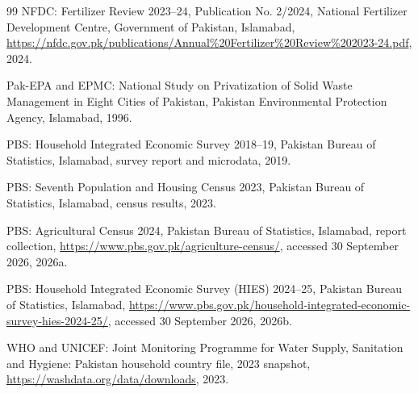 \documentclass[essd]{copernicus}
\begin{document}
\begin{thebibliography}{99}
NFDC: Fertilizer Review 2023--24, Publication No. 2/2024, National Fertilizer Development Centre, Government of Pakistan, Islamabad, \url{https://nfdc.gov.pk/publications/Annual%20Fertilizer%20Review%202023-24.pdf}, 2024.

Pak-EPA and EPMC: National Study on Privatization of Solid Waste Management in Eight Cities of Pakistan, Pakistan Environmental Protection Agency, Islamabad, 1996.

PBS: Household Integrated Economic Survey 2018--19, Pakistan Bureau of Statistics, Islamabad, survey report and microdata, 2019.

PBS: Seventh Population and Housing Census 2023, Pakistan Bureau of Statistics, Islamabad, census results, 2023.

PBS: Agricultural Census 2024, Pakistan Bureau of Statistics, Islamabad, report collection, \url{https://www.pbs.gov.pk/agriculture-census/}, accessed 30 September 2026, 2026a.

PBS: Household Integrated Economic Survey (HIES) 2024--25, Pakistan Bureau of Statistics, Islamabad, \url{https://www.pbs.gov.pk/household-integrated-economic-survey-hies-2024-25/}, accessed 30 September 2026, 2026b.

WHO and UNICEF: Joint Monitoring Programme for Water Supply, Sanitation and Hygiene: Pakistan household country file, 2023 snapshot, \url{https://washdata.org/data/downloads}, 2023.

\end{thebibliography}
\end{document}
